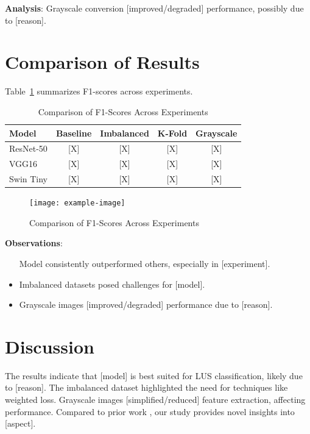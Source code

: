 \documentclass[12pt, a4paper]{article}
\begin{document}
\textbf{Analysis}: Grayscale conversion [improved/degraded] performance, possibly due to [reason].

\section{Comparison of Results}
\label{sec:comparison}
Table~\ref{tab:comparison} summarizes F1-scores across experiments.

\begin{table}[h]
    \centering
    \caption{Comparison of F1-Scores Across Experiments}
    \label{tab:comparison}
    \begin{tabular}{lcccc}
        \toprule
        Model & Baseline & Imbalanced & K-Fold & Grayscale \\
        \midrule
        ResNet-50 & [X] & [X] & [X] & [X] \\
        VGG16 & [X] & [X] & [X] & [X] \\
        Swin Tiny & [X] & [X] & [X] & [X] \\
        \bottomrule
    \end{tabular}
\end{table}

\begin{figure}[h]
    \centering
    \texttt{[image: example-image]} %
    \caption{Comparison of F1-Scores Across Experiments}
    \label{fig:comparison}
\end{figure}

\textbf{Observations}:
\begin{itemize}
    \item [Model] consistently outperformed others, especially in [experiment].
    \item Imbalanced datasets posed challenges for [model].
    \item Grayscale images [improved/degraded] performance due to [reason].
\end{itemize}

\section{Discussion}
\label{sec:discussion}
The results indicate that [model] is best suited for LUS classification, likely due to [reason]. The imbalanced dataset highlighted the need for techniques like weighted loss. Grayscale images [simplified/reduced] feature extraction, affecting performance. Compared to prior work \cite{cite}, our study provides novel insights into [aspect].
\end{document}
